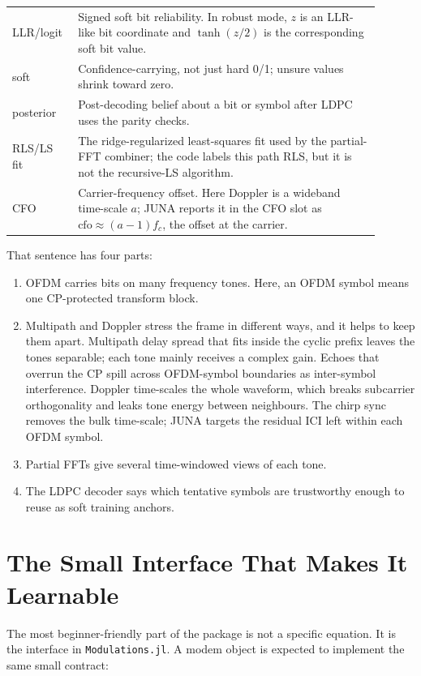 \documentclass[11pt]{article}
\newcommand{\code}[1]{\texttt{#1}}
\newcommand{\juna}{JUNA}
\begin{document}
\begin{center}
\begin{tabular}{p{0.14\linewidth}p{0.76\linewidth}}
LLR/logit & Signed soft bit reliability. In robust mode, \(z\) is an LLR-like bit coordinate and \(\tanh(z/2)\) is the corresponding soft bit value. \\
soft & Confidence-carrying, not just hard 0/1; unsure values shrink toward zero. \\
posterior & Post-decoding belief about a bit or symbol after LDPC uses the parity checks. \\
RLS/LS fit & The ridge-regularized least-squares fit used by the partial-FFT combiner; the code labels this path RLS, but it is not the recursive-LS algorithm. \\
CFO & Carrier-frequency offset. Here Doppler is a wideband time-scale \(a\); \juna{} reports it in the CFO slot as \(\mathrm{cfo}\approx(a-1)f_c\), the offset at the carrier. \\
\bottomrule
\end{tabular}
\end{center}

That sentence has four parts:
\begin{enumerate}
  \item OFDM carries bits on many frequency tones. Here, an OFDM symbol means
        one CP-protected transform block.
  \item Multipath and Doppler stress the frame in different ways, and it helps
        to keep them apart. Multipath delay spread that fits inside the cyclic
        prefix leaves the tones separable; each tone mainly receives a complex
        gain. Echoes that overrun the CP spill across OFDM-symbol boundaries as
        inter-symbol interference. Doppler time-scales the whole waveform,
        which breaks subcarrier orthogonality and leaks tone energy between
        neighbours. The chirp sync removes the bulk time-scale; \juna{} targets
        the residual ICI left within each OFDM symbol.
  \item Partial FFTs give several time-windowed views of each tone.
  \item The LDPC decoder says which tentative symbols are trustworthy enough to
        reuse as soft training anchors.
\end{enumerate}

\section{The Small Interface That Makes It Learnable}

The most beginner-friendly part of the package is not a specific equation. It is
the interface in \code{Modulations.jl}. A modem object is expected to implement
the same small contract:
\end{document}
